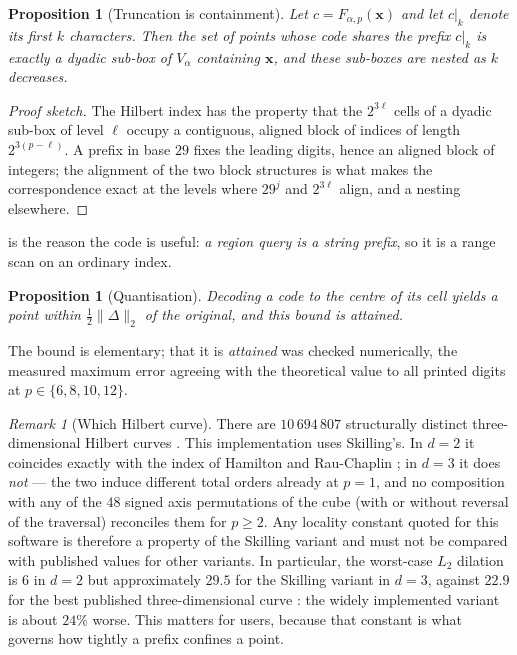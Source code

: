 \documentclass[11pt,a4paper]{article}
\theoremstyle{plain}
\newtheorem{proposition}[theorem]{Proposition}
\theoremstyle{definition}
\theoremstyle{remark}
\newtheorem{remark}[theorem]{Remark}
\begin{document}
\begin{proposition}[Truncation is containment]\label{prop:trunc}
Let $c=F_{\alpha,p}(\mathbf{x})$ and let $c|_k$ denote its first $k$
characters. Then the set of points whose code shares the prefix $c|_k$ is
exactly a dyadic sub-box of $V_\alpha$ containing $\mathbf{x}$, and these
sub-boxes are nested as $k$ decreases.
\end{proposition}

\begin{proof}[Proof sketch]
The Hilbert index has the property that the $2^{3\ell}$ cells of a dyadic
sub-box of level $\ell$ occupy a contiguous, aligned block of indices of
length $2^{3(p-\ell)}$. A prefix in base $29$ fixes the leading digits,
hence an aligned block of integers; the alignment of the two block
structures is what makes the correspondence exact at the levels where
$29^{j}$ and $2^{3\ell}$ align, and a nesting elsewhere.
\end{proof}

 is the reason the code is useful: \emph{a region query is
a string prefix}, so it is a range scan on an ordinary index.

\begin{proposition}[Quantisation]\label{prop:quant}
Decoding a code to the centre of its cell yields a point within
$\tfrac12\|\Delta\|_2$ of the original, and this bound is attained.
\end{proposition}

The bound is elementary; that it is \emph{attained} was checked
numerically, the measured maximum error agreeing with the theoretical value
to all printed digits at $p\in\{6,8,10,12\}$.

\begin{remark}[Which Hilbert curve]\label{rem:variant}
There are $10\,694\,807$ structurally distinct three-dimensional Hilbert
curves \cite{haverkort}. This implementation uses Skilling's. In $d=2$ it
coincides exactly with the index of Hamilton and Rau-Chaplin
\cite{hamilton}; in $d=3$ it does \emph{not} --- the two induce different
total orders already at $p=1$, and no composition with any of the $48$
signed axis permutations of the cube (with or without reversal of the
traversal) reconciles them for $p\ge2$. Any locality constant quoted for
this software is therefore a property of the Skilling variant and must not
be compared with published values for other variants. In particular, the
worst-case $L_2$ dilation is $6$ in $d=2$ \cite{moon} but approximately
$29.5$ for the Skilling variant in $d=3$, against $22.9$ for the best
published three-dimensional curve \cite{haverkort}: the widely implemented
variant is about $24\%$ worse. This matters for users, because that
constant is what governs how tightly a prefix confines a point.
\end{remark}
\end{document}

